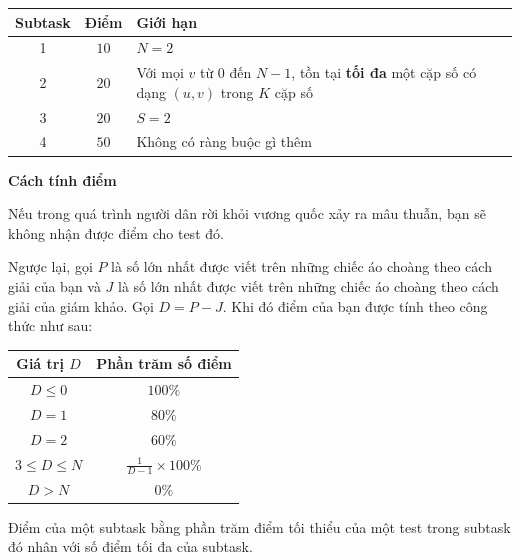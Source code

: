 \begin{center}
  \begin{tabular}{|c|c|l|} \hline
    \textbf{Subtask} & \textbf{Điểm} & \textbf{Giới hạn} \\ \hline
    1 & $10$ & $N=2$ \\ \hline
    2 & $20$ & Với mọi $v$ từ $0$ đến $N-1$, tồn tại \textbf{tối đa} một cặp số có dạng $(u,v)$ trong $K$ cặp số \\ \hline
    3 & $20$ & $S=2$ \\ \hline
    4 & $50$ & Không có ràng buộc gì thêm \\ \hline
  \end{tabular}
\end{center}

\textbf{Cách tính điểm}

Nếu trong quá trình người dân rời khỏi vương quốc xảy ra mâu thuẫn, bạn sẽ không nhận được điểm cho test đó.

Ngược lại, gọi $P$ là số lớn nhất được viết trên những chiếc áo choàng theo cách giải của bạn và $J$ là số lớn nhất được viết trên những chiếc áo choàng theo cách giải của giám khảo. Gọi $D=P-J$. Khi đó điểm của bạn được tính theo công thức như sau:

\begin{center}
  \begin{tabular}{|c|c|} \hline
    \textbf{Giá trị $D$} & \textbf{Phần trăm số điểm} \\ \hline
    $D\le 0$ & $100\%$ \\ \hline
    $D=1$ & $80\%$ \\ \hline
    $D=2$ & $60\%$ \\ \hline
    $3\le D\le N$ & $\frac{1}{D-1}\times 100\%$ \\ \hline
    $D\gt N$ & $0\%$ \\ \hline
  \end{tabular}
\end{center}

Điểm của một subtask bằng phần trăm điểm tối thiểu của một test trong subtask đó nhân với số điểm tối đa của subtask.